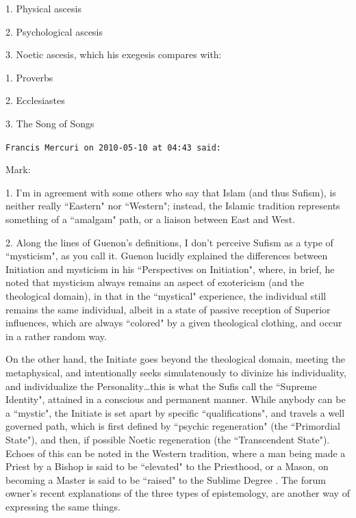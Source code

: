 \begin{footnotesize}
\begin{sffamily}
1. Physical ascesis

2. Psychological ascesis

3. Noetic ascesis, which his exegesis compares with:

1. Proverbs

2. Ecclesiastes

3. The Song of Songs


\hfill

\texttt{Francis Mercuri on 2010-05-10 at 04:43 said: }

Mark:

1. I'm in agreement with some others who say that Islam (and thus Sufism), is neither really ``Eastern" nor ``Western"; instead, the Islamic tradition represents something of a ``amalgam" path, or a liaison between East and West.

2. Along the lines of Guenon's definitions, I don't perceive Sufism as a type of ``mysticism", as you call it. Guenon lucidly explained the differences between Initiation and mysticism in his ``Perspectives on Initiation", where, in brief, he noted that mysticism always remains an aspect of exotericism (and the theological domain), in that in the ``mystical" experience, the individual still remains the same individual, albeit in a state of passive reception of Superior influences, which are always ``colored" by a given theological clothing, and occur in a rather random way. 

On the other hand, the Initiate goes beyond the theological domain, meeting the metaphysical, and intentionally seeks simulatenously to divinize his individuality, and individualize the Personality…this is what the Sufis call the ``Supreme Identity", attained in a conscious and permanent manner. While anybody can be a ``mystic", the Initiate is set apart by specific ``qualifications", and travels a well governed path, which is first defined by ``psychic regeneration" (the ``Primordial State"), and then, if possible Noetic regeneration (the ``Transcendent State"). Echoes of this can be noted in the Western tradition, where a man being made a Priest by a Bishop is said to be ``elevated" to the Priesthood, or a Mason, on becoming a Master is said to be ``raised" to the Sublime Degree . The forum owner's recent explanations of the three types of epistemology, are another way of expressing the same things. 


\end{sffamily}
\end{footnotesize}
